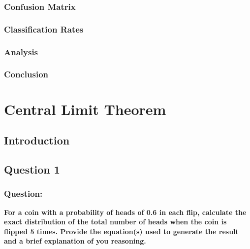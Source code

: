\documentclass[12pt,twoside,a4paper]{article}
\begin{document}
\subsubsection{Confusion Matrix}

\subsubsection{Classification Rates}

\subsubsection{Analysis}

\subsubsection{Conclusion}

\pagebreak
\section{Central Limit Theorem}

\subsection{Introduction}

\subsection{Question 1}

\subsubsection*{Question:}
\textbf{For a coin with a probability of heads of 0.6 in each flip, calculate the exact distribution of the total number of heads when the coin is flipped 5 times. Provide the equation(s) used to generate the result and a brief explanation of you reasoning.}
\end{document}

